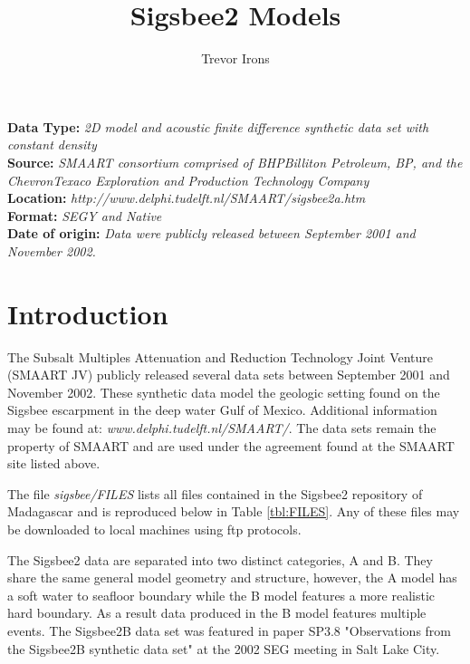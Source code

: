 \title{Sigsbee2 Models}
\author{Trevor Irons}
\maketitle

\lstset{language=python,numbers=left,numberstyle=\tiny,showstringspaces=false}

\noindent
\textbf	{Data Type:} \emph{2D model and acoustic finite difference synthetic data set with constant density}\\
\textbf	{Source:} \emph{SMAART consortium comprised of BHPBilliton Petroleum, BP, and the ChevronTexaco Exploration 
and Production Technology Company}\\
\textbf {Location:} \emph{http://www.delphi.tudelft.nl/SMAART/sigsbee2a.htm}\\
\textbf	{Format:} \emph{SEGY and Native} \\
\textbf{Date of origin:} \emph{Data were publicly released between September 2001 and November 2002.}\\ 

\section{Introduction}
The Subsalt Multiples Attenuation and Reduction Technology Joint Venture (SMAART JV) publicly released several data sets 
between September 2001 and November 2002.  These synthetic data model the geologic setting found on the Sigsbee escarpment 
in the deep water Gulf of Mexico.  Additional information may be found at: \emph{www.delphi.tudelft.nl/SMAART/}.  
The data sets remain the property of SMAART and are used under the agreement found at the SMAART site listed above.  

The file \emph{sigsbee/FILES} lists all files contained in the Sigsbee2 repository of Madagascar and is reproduced below in
Table \ref{tbl:FILES}.  Any of these files may be downloaded to local machines using ftp protocols.  

The Sigsbee2 data are separated into two distinct categories, A and B.  They share the same general model geometry and structure,
however, the A model has a soft water to seafloor boundary while the B model features a more realistic hard boundary.  As a result 
data produced in the B model features multiple events.  The Sigsbee2B data set was featured in paper SP3.8 "Observations from the 
Sigsbee2B synthetic data set" at the 2002 SEG meeting in Salt Lake City.  

